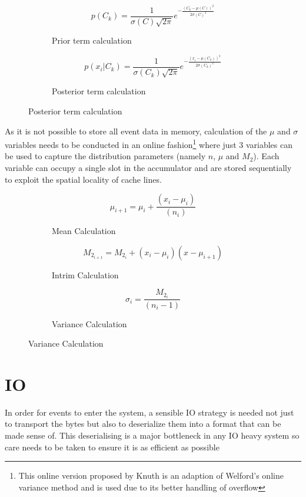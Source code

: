 \documentclass[a4paper,11pt]{scrreprt}
\begin{document}
\begin{figure}[h!]
\begin{subfigure}[t]{2.5 in}
\[p(C_k) = \frac{1}{\sigma(C)\sqrt{2\pi}}e^{-\frac{(C_k - \mu(C))^2}{2\sigma(C)^2}}\]
\caption{Prior term calculation}
\end{subfigure}
\begin{subfigure}[t]{2.5 in}
\[p(x_i | C_k) = \frac{1}{\sigma(C_k)\sqrt{2\pi}}e^{-\frac{(x_i - \mu(C_k))^2}{2\sigma(C_k)^2}}\]
\caption{Posterior term calculation}
\end{subfigure}
\end{figure}
As it is not possible to store all event data in memory, calculation of the \(\mu\) and \(\sigma\) variables needs to be conducted in an online fashion\footnote{This online version proposed by Knuth\cite{knuth-aop} is an adaption of Welford's online variance method and is used due to its better handling of overflow} where just 3 variables can be used to capture the distribution parameters (namely \(n\), \(\mu\) and \(M_2\)). Each variable can occupy a single slot in the accumulator and are stored sequentially to exploit the spatial locality of cache lines.

\captionsetup[subfigure]{labelfont=bf,textfont=normalfont,singlelinecheck=off,justification=centering,labelformat=simple, labelsep=colon}
\begin{figure}[h!]
\begin{subfigure}[t]{2.5 in}
\[\mu_{i+1} = \mu_i + \frac{(x_i - \mu_i)}{(n_i)}\]
\caption{Mean Calculation}
\end{subfigure}
\begin{subfigure}[t]{2.5 in}
\[M_{2_{i+1}} = M_{2_i} + (x_i - \mu_i)(x - \mu_{i+1})\]
\caption{Intrim Calculation}
\end{subfigure}
\begin{subfigure}[t]{2.5 in}
\[\sigma_i = \frac{M_{2_i}}{(n_i-1)}\]
\caption{Variance Calculation}
\end{subfigure}
\end{figure}


\section{IO}
In order for events to enter the system, a sensible IO strategy is needed not just to transport the bytes but also to deserialize them into a format that can be made sense of. This deserialising is a major bottleneck in any IO heavy system so care needs to be taken to ensure it is as efficient as possible
\end{document}
